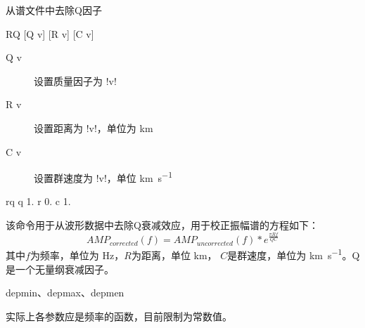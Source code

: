 \label{cmd:rq}

从谱文件中去除Q因子

\begin{SACSTX}
RQ [Q v] [R v] [C v]
\end{SACSTX}

\begin{description}
\item [Q v] 设置质量因子为 !v!
\item [R v] 设置距离为 !v!，单位为 \si{\km}
\item [C v] 设置群速度为 !v!，单位 \si{\km\per\s}
\end{description}

\begin{SACDFT}
rq q 1. r 0. c 1.
\end{SACDFT}

该命令用于从波形数据中去除Q衰减效应，用于校正振幅谱的方程如下：
\[ AMP_{corrected}(f) = AMP_{uncorrected}(f) * e^{\frac{\pi R f}{Q C}} \]
其中$f$为频率，单位为 \si{\Hz}，$R$为距离，单位 \si{\km}，
$C$是群速度，单位为 \si{\km\per\s}。Q是一个无量纲衰减因子。

depmin、depmax、depmen

实际上各参数应是频率的函数，目前限制为常数值。
